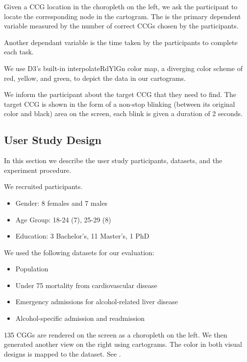  Given a CCG location in the choropleth on the left, we ask the participant to locate the corresponding node in the cartogram. The is the primary dependent variable measured by the number of correct CCGs chosen by the participants.

 Another dependant variable is the time taken by the participants to complete each task.

 We use D3's built-in interpolateRdYlGn color map, a diverging color scheme of red, yellow, and green, to depict the data in our cartograms.

 We inform the participant about the target CCG that they need to find. The target CCG is shown in the form of a non-stop blinking (between its original color and black) area on the screen, each blink is given a duration of 2 seconds.

\subsection{User Study Design}
In this section we describe the user study participants, datasets, and the experiment procedure.

 We recruited \pCount participants.

\begin{itemize}
    \item Gender:  8 females and 7 males
    \item Age Group:   18-24 (7), 25-29 (8)
    \item Education:   3 Bachelor's, 11 Master's, 1 PhD
\end{itemize}

 We used the following datasets for our evaluation:

\begin{itemize}
    \item Population
    \item Under 75 mortality from cardiovascular disease
    \item Emergency admissions for alcohol-related liver disease
    \item Alcohol-specific admission and readmission
\end{itemize}

135 CGGs are rendered on the screen as a choropleth on the left. We then generated another view on the right using cartograms. The color in both visual designs is mapped to the dataset. See .

